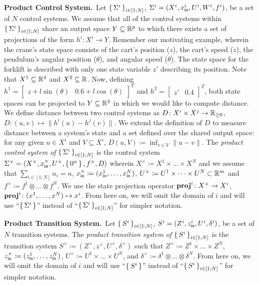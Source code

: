 \smallskip
\noindent\textbf{Product Control System.}\
Let $\set{\Sigma^i}_{i\in [1;N]}$, $\Sigma^i=(X^i,x_{\mathsf{in}}^i,U^i,W^i,f^i)$, be a set of $N$ control systems. 
We assume that all of the control systems within $\set{\Sigma^i}_{i\in [1;N]}$ share an output space $Y\subseteq\mathbb{R}^p$ to which there exists a set of projections of the form $h^i\colon X^i\rightarrow Y$. Remember our motivating example, wherein the crane's state space consists of the cart's position ($z$), the cart's speed ($\dot z$), the pendulum's angular position ($\theta$), and angular speed ($\dot \theta$). The state space for the forklift is described with only one state variable $z'$ describing its position. Note that $X^1\subseteq \mathbb{R}^4$ and $X^2\subseteq \mathbb{R}$. Now, defining $h^1=\begin{bmatrix}z+l\sin(\theta)&0.6+l\cos(\theta)\end{bmatrix}^T$ and $h^2=\begin{bmatrix}z'&0.4\end{bmatrix}^T$, both state spaces can be projected to $Y\subseteq \mathbb{R}^2$ in which we would like to compute distance.
We define distance between two control systems as $D\colon X^i\times X^j\rightarrow \mathbb{R}_{\geq 0}$, $D\colon (u,v)\mapsto\| h^i(u)-h^j(v)\|$. We extend the definition of $D$ to measure distance between a system's state and a set defined over the shared output space: for any given $u\in X^i$ and $V\subseteq X^i$, $D(u,V) \coloneqq \inf_{v\in V}\|u-v\|$. The \emph{product control system of } $\set{\Sigma^i}_{i\in [1;N]}$ is the control system $\Sigma^\times = (X^\times, x_{\mathsf{in}}^\times, U^\times, \set{0^n}, f^\times, D)$ wherein $X^\times\coloneqq X^1\times \ldots \times X^N$ and we assume that $\sum_{i\in [1;N]} n_i=n$, $x_{\mathsf{in}}^\times\coloneqq (x_{\mathsf{in}}^1,\ldots,x_{\mathsf{in}}^N)$, $U^\times\coloneqq U^1\times\dots\times U^N\subset \mathbb{R}^m$ and $f^\times\coloneqq f^{1}\otimes \ldots\otimes f^{N}$. 
We use the state projection operator $\mathbf{proj}^{i}\colon X^\times\to X^i$, $\mathbf{proj}^{i}\colon (x^1,\ldots,x^N)\mapsto x^i$.
From here on, we will omit the domain of $i$ and will use ``$\set{\Sigma^i}$'' instead of ``$\set{\Sigma^i}_{i\in [1;N]}$'' for simpler notation.

\smallskip
\noindent\textbf{Product Transition System.}\
Let $\set{S^i}_{i\in [1;N]}$, $S^i=(Z^i,z_{\mathsf{in}}^i,U^i,\delta^i)$, be a set of $N$ transition systems.
The \emph{product transition system of } $\set{S^i}_{i\in [1;N]}$ is the transition system $S^\times \coloneqq (Z^\times, z^\times, U^\times, \delta^\times)$ such that $Z^\times \coloneqq Z^1\times \ldots \times Z^N$, $z^\times_{\mathsf{in}}\coloneqq (z_{\mathsf{in}}^1,\ldots,z_{\mathsf{in}}^N)$, $U^\times \coloneqq U^1\times \ldots\times U^N$, and $\delta^\times \coloneqq \delta^1\otimes\ldots \otimes \delta^N$.
From here on, we will omit the domain of $i$ and will use ``$\set{S^i}$'' instead of ``$\set{S^i}_{i\in [1;N]}$'' for simpler notation.

